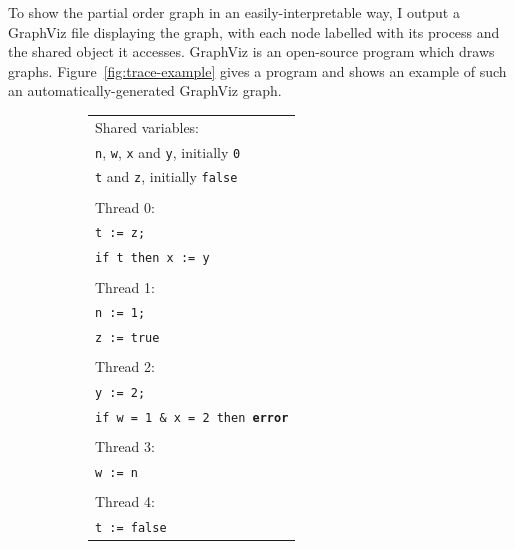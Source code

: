 \documentclass[12pt,a4paper,twoside,openright]{report}
\begin{document}
To show the partial order graph in an
easily-interpretable way, I
output a GraphViz file displaying the
graph, with each node
labelled with its process and the
shared object it accesses.
GraphViz is an open-source program which
draws graphs.
Figure~\ref{fig:trace-example} gives a program
and shows an example of such an
automatically-generated GraphViz graph.

\begin{figure}
	\centering
	\begin{subfigure}{0.5\textwidth}
		\centering
		\begin{tabular}{l}
			Shared variables: \\
			\qquad \texttt{n}, \texttt{w},
			\texttt{x} and \texttt{y},
			initially \texttt{0} \\
			\qquad \texttt{t} and \texttt{z},
			initially \texttt{false} \\
			\\
			Thread 0: \\
			\qquad \texttt{t := z;} \\
			\qquad \texttt{if t then x := y} \\
			\\
			Thread 1: \\
			\qquad \texttt{n := 1;} \\
			\qquad \texttt{z := true} \\
			\\
			Thread 2: \\
			\qquad \texttt{y := 2;} \\
			\qquad \texttt{if w = 1 \& x = 2 then \textbf{error}} \\
			\\
			Thread 3: \\
			\qquad \texttt{w := n} \\
			\\
			Thread 4: \\
			\qquad \texttt{t := false} \\
		\end{tabular}
	\end{subfigure}%
	\begin{subfigure}{0.5\textwidth}
		\centering

\end{subfigure}
\end{figure}
\end{document}
